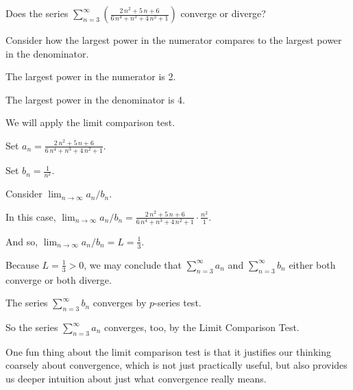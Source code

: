 \documentclass{ximera}
\begin{document}
\begin{question}
  Does the series \(\displaystyle\sum_{n=3}^\infty \left( \displaystyle\frac{2 \, n^{2} + 5 \, n + 6}{6 \, n^{4} + n^{3} + 4 \, n^{2} + 1} \right)\) converge or diverge?
  
  \begin{solution}
    \begin{hint}
      Consider how the largest power in the numerator compares to the largest power in the denominator.
    \end{hint}
    \begin{hint}
      The largest power in the numerator is 2.
    \end{hint}
    \begin{hint}
      The largest power in the denominator is 4.
    \end{hint}
    \begin{hint}
      We will apply the limit comparison test.
    \end{hint}
    \begin{hint}
      Set \(a_{n} = \displaystyle\frac{2 \, n^{2} + 5 \, n + 6}{6 \, n^{4} + n^{3} + 4 \, n^{2} + 1}\).
    \end{hint}
    \begin{hint}
      Set \(b_{n} = \displaystyle\frac{1}{n^{2}}\).
    \end{hint}
    \begin{hint}
      Consider \(\lim_{n\to \infty} a_n/b_n\).
    \end{hint}
    \begin{hint}
      In this case, \(\lim_{n\to \infty} a_n/b_n = \displaystyle\frac{2 \, n^{2} + 5 \, n + 6}{6 \, n^{4} + n^{3} + 4 \, n^{2} + 1} \cdot \displaystyle\frac{n^{2}}{1}\).
    \end{hint}
    \begin{hint}
      And so, \(\lim_{n\to \infty} a_n/b_n = L = \displaystyle\frac{1}{3}\).
    \end{hint}
    \begin{hint}
      Because \(L = \displaystyle\frac{1}{3} > 0\), we may conclude that \(\displaystyle\sum_{n=3}^\infty a_{n}\) and \(\displaystyle\sum_{n=3}^\infty b_{n}\) either both converge or both diverge.
    \end{hint}
    \begin{hint}
      The series \(\displaystyle\sum_{n=3}^\infty b_{n}\) converges by \(p\)-series test.
    \end{hint}
    \begin{hint}
      So the series \(\displaystyle\sum_{n=3}^\infty a_{n}\) converges, too, by the Limit Comparison Test.
      
    \end{hint}
    
    \begin{multiple-choice}
      
    \end{multiple-choice}
    
  \end{solution}
\end{question}

One fun thing about the limit comparison test is that it justifies our thinking coarsely about convergence, which is not just practically useful, but also provides us deeper intuition about just what convergence really means.

\end{document}
